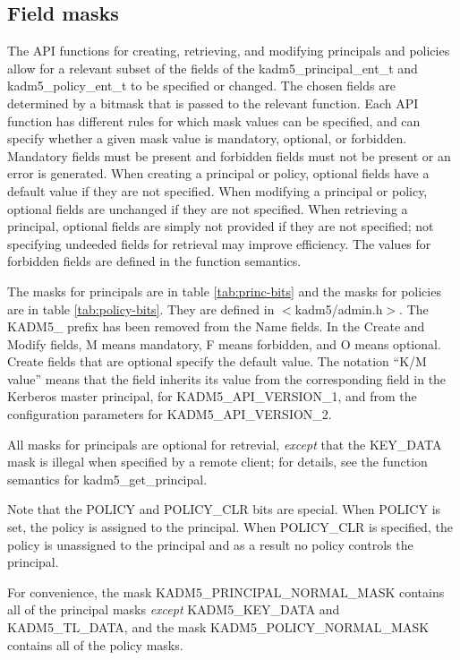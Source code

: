 \subsection{Field masks}
\label{sec:masks}

The API functions for creating, retrieving, and modifying principals
and policies allow for a relevant subset of the fields of the
kadm5_principal_ent_t and kadm5_policy_ent_t to be specified or
changed.  The chosen fields are determined by a bitmask that is passed
to the relevant function.  Each API function has different rules for
which mask values can be specified, and can specify whether a given
mask value is mandatory, optional, or forbidden.  Mandatory fields
must be present and forbidden fields must not be present or an error
is generated.  When creating a principal or policy, optional fields
have a default value if they are not specified.  When modifying a
principal or policy, optional fields are unchanged if they are not
specified.  When retrieving a principal, optional fields are simply
not provided if they are not specified; not specifying undeeded fields
for retrieval may improve efficiency.  The values for forbidden fields
are defined in the function semantics.

The masks for principals are in table \ref{tab:princ-bits} and the
masks for policies are in table \ref{tab:policy-bits}.  They are
defined in $<$kadm5/admin.h$>$. The KADM5_ prefix has been removed
from the Name fields.  In the Create and Modify fields, M means
mandatory, F means forbidden, and O means optional.  Create fields
that are optional specify the default value.  The notation ``K/M
value'' means that the field inherits its value from the corresponding
field in the Kerberos master principal, for KADM5_API_VERSION_1, and
from the configuration parameters for KADM5_API_VERSION_2.

All masks for principals are optional for retrevial, {\it except} that
the KEY_DATA mask is illegal when specified by a remote client; for
details, see the function semantics for kadm5_get_principal.

Note that the POLICY and POLICY_CLR bits are special.  When POLICY is
set, the policy is assigned to the principal.  When POLICY_CLR is
specified, the policy is unassigned to the principal and as a result
no policy controls the principal.

For convenience, the mask KADM5_PRINCIPAL_NORMAL_MASK contains all of
the principal masks {\it except} KADM5_KEY_DATA and KADM5_TL_DATA, and
the mask KADM5_POLICY_NORMAL_MASK contains all of the policy masks.

